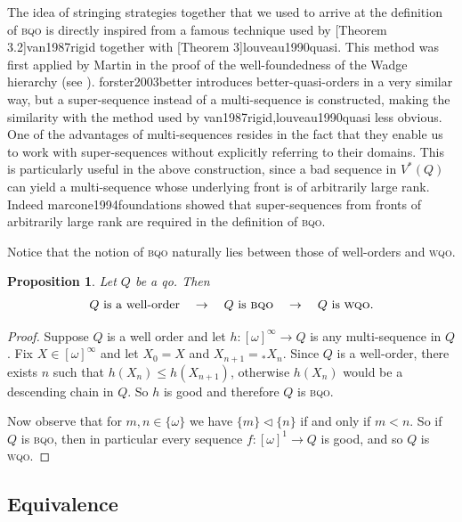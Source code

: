 \documentclass{article}%
\newcommand\textcite{}
\newcommand\Textcite{}
\theoremstyle{plain}
\newtheorem{proposition}[theorem]{Proposition}
\theoremstyle{definition}
\theoremstyle{remark}
\newcommand{\wqo}{\textsc{wqo}}
\newcommand{\bqo}{\textsc{bqo}}
\newcommand{\PowerQ}{V^{*}}
\newcommand{\tri} {\mathrel{\lhd}}
\newcommand{\shift}[1]{{}_{*}#1}
\newcommand{\infSub}[1]{[#1]^{\infty}}
\begin{document}
 The idea of stringing strategies together that we used to arrive at the definition of \bqo{} is directly inspired from a famous technique used by \textcite[Theorem 3.2]{van1987rigid} together with \textcite[Theorem 3]{louveau1990quasi}. This method was first applied by Martin in the proof of the well-foundedness of the Wadge hierarchy (see \cite[(21.15), p. 158]{kechris1995classical}). \Textcite{forster2003better} introduces better-quasi-orders in a very similar way, but a super-sequence instead of a multi-sequence is constructed, making the similarity with the method used by \textcite{van1987rigid,louveau1990quasi} less obvious. One of the advantages of multi-sequences resides in the fact that they enable us to work with super-sequences without explicitly referring to their domains. This is particularly useful in the above construction, since a bad sequence in $\PowerQ(Q)$ can yield a multi-sequence whose underlying front is of arbitrarily large rank.  Indeed \textcite{marcone1994foundations} showed that super-sequences from fronts of arbitrarily large rank are required in the definition of \bqo{}.

Notice that the notion of \bqo{} naturally lies between those of well-orders and \wqo.

\begin{proposition}\label{prop WellOrderWqoBqo}
Let $Q$ be a qo. Then
\[
\text{$Q$ is a well-order} \quad\to\quad \text{$Q$ is \bqo{}}\quad \to\quad \text{$Q$ is \wqo{}.}
\]
\end{proposition}
\begin{proof}
Suppose $Q$ is a well order and let $h:\infSub{\omega}\to Q$ is any multi-sequence in $Q$. Fix $X\in\infSub{\omega}$ and let $X_{0}=X$ and $X_{n+1}=\shift{X_{n}}$. Since $Q$ is a well-order, there exists $n$ such that $h(X_{n})\leq h(X_{n+1})$, otherwise $h(X_{n})$ would be a descending chain in $Q$. So $h$ is good and therefore $Q$ is \bqo{}.

Now observe that for $m,n\in\{\omega\}$ we have $\{m\}\tri \{n\}$ if and only if $m<n$. So if $Q$ is \bqo{}, then in particular every sequence $f:[\omega]^{1}\to Q$ is good, and so $Q$ is \wqo{}.
\end{proof}







 
\subsection{Equivalence}\label{subsec BqoEquiv}
\end{document}
